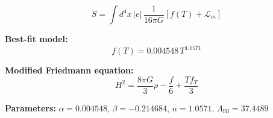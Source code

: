 
\begin{equation}
  S = \int d^4x \, |e| \, \frac{1}{16\pi G} \left[ f(T) + \mathcal{L}_m \right]
\end{equation}

\textbf{Best-fit model:}
\begin{equation}
  f(T) = 0.004548 \, T^{1.0571}
\end{equation}

\textbf{Modified Friedmann equation:}
\begin{equation}
  H^2 = \frac{8\pi G}{3} \rho - \frac{f}{6} + \frac{T f_T}{3}
\end{equation}

\textbf{Parameters:}
$\alpha = 0.004548$, \quad
$\beta = -0.214684$, \quad
$n = 1.0571$, \quad
$\Lambda_{\text{BI}} = 37.4489$